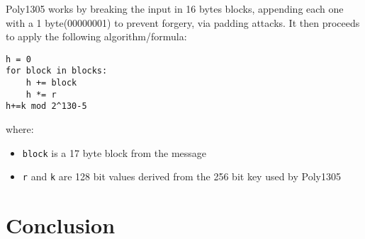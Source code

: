 \documentclass[twocolumn]{article}
\begin{document}
Poly1305 works by breaking the input in 16 bytes blocks, appending each one with a 1 byte(00000001) to prevent forgery, via padding attacks. It then proceeds to apply the following 
algorithm/formula:

\begin{verbatim}
h = 0
for block in blocks:
    h += block
    h *= r
h+=k mod 2^130-5
\end{verbatim}

where:
\begin{itemize}
    \item \texttt{block} is a 17 byte block from the message 
    \item \texttt{r} and \texttt{k} are 128 bit values derived from the 256 bit key used by Poly1305
\end{itemize}


\section{Conclusion}

\printbibliography
\end{document}
